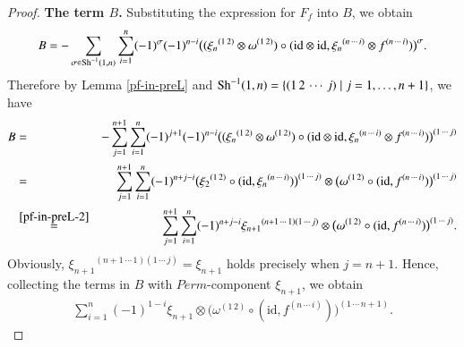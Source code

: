 \documentclass[12pt]{amsart}
\theoremstyle{definition}
\newcommand{\id}{\mathrm{id}}
\newcommand{\ot}{\otimes}
\newcommand{\Sh}{{\rm Sh}}
\begin{document}
\begin{proof}
\textbf{The term $B$.}
Substituting the expression for $F_f$ into $B$, we obtain
$$
B=-\sum\limits_{\sigma\in\Sh^{-1}(1,n)}\sum\limits_{i=1}^{n}(-1)^{\sigma}(-1)^{n-i}\bigl(({\xi_n}^{(1\,2)}\otimes\omega^{(1\,2)})\circ(\id\otimes\id,{\xi_n}^{(n\,\cdots\,i)}\ot f^{(n\,\cdots\,i)})\bigr)^{\sigma}.
$$
Therefore by Lemma \ref{pf-in-preL} and $\Sh^{-1}(1,n)=\{(1\,2\,\cdots\,j)\mid j=1,\dots,n+1\}$, we have
	\begin{eqnarray*}
		B&=&-\sum\limits_{j=1}^{n+1}\sum\limits_{i=1}^{n} (-1)^{j+1}(-1)^{n-i} \bigl(({\xi_n}^{(1\,2)}\ot \omega^{(1\,2)})\circ(\id\ot\id,{\xi_n}^{(n\,\cdots\,i)}\ot f^{(n\,\cdots\,i)})\bigr)^{(1\,\cdots\,j)}\\
		&=&\sum\limits_{j=1}^{n+1}\sum\limits_{i=1}^{n} (-1)^{n+j-i} \bigl({\xi_2}^{(1\,2)}\circ(\id, {\xi_n}^{(n\,\cdots\,i)})\bigr)^{(1\,\cdots\,j)}\ot \bigl(\omega^{(1\,2)}\circ (\id,f^{(n\,\cdots\,i)})\bigr)^{(1\,\cdots\,j)}\\
		&\overset{\eqref{pf-in-preL-2}}{=}&\sum\limits_{j=1}^{n+1}\sum\limits_{i=1}^{n} (-1)^{n+j-i} {\xi_{n+1}}^{(n+1\,\cdots\,1)(1\,\cdots\,j)}\ot \bigl(\omega^{(1\,2)}\circ (\id,f^{(n\,\cdots\,i)})\bigr)^{(1\,\cdots\,j)}.
	\end{eqnarray*}
Obviously,
${\xi_{n+1}}^{(n+1\,\cdots\,1)(1\,\cdots\,j)}=\xi_{n+1}$ holds precisely when $j=n+1$. Hence, collecting the terms in $B$ with $Perm$-component $\xi_{n+1}$, we obtain
	\begin{eqnarray}\label{eq-preL-cochain-2}
		\sum\limits_{i=1}^n (-1)^{1-i} \xi_{n+1}\ot \bigl(\omega^{(1\,2)}\circ (\id,f^{(n\,\cdots\,i)})\bigr)^{(1\,\cdots\,n+1)}.
	\end{eqnarray}


\end{proof}
\end{document}
